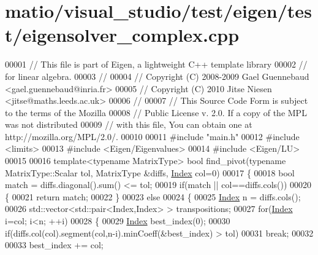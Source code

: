 \hypertarget{matio_2visual__studio_2test_2eigen_2test_2eigensolver__complex_8cpp_source}{}\section{matio/visual\+\_\+studio/test/eigen/test/eigensolver\+\_\+complex.cpp}
\label{matio_2visual__studio_2test_2eigen_2test_2eigensolver__complex_8cpp_source}

\begin{DoxyCode}
00001 \textcolor{comment}{// This file is part of Eigen, a lightweight C++ template library}
00002 \textcolor{comment}{// for linear algebra.}
00003 \textcolor{comment}{//}
00004 \textcolor{comment}{// Copyright (C) 2008-2009 Gael Guennebaud <gael.guennebaud@inria.fr>}
00005 \textcolor{comment}{// Copyright (C) 2010 Jitse Niesen <jitse@maths.leeds.ac.uk>}
00006 \textcolor{comment}{//}
00007 \textcolor{comment}{// This Source Code Form is subject to the terms of the Mozilla}
00008 \textcolor{comment}{// Public License v. 2.0. If a copy of the MPL was not distributed}
00009 \textcolor{comment}{// with this file, You can obtain one at http://mozilla.org/MPL/2.0/.}
00010 
00011 \textcolor{preprocessor}{#include "main.h"}
00012 \textcolor{preprocessor}{#include <limits>}
00013 \textcolor{preprocessor}{#include <Eigen/Eigenvalues>}
00014 \textcolor{preprocessor}{#include <Eigen/LU>}
00015 
00016 \textcolor{keyword}{template}<\textcolor{keyword}{typename} MatrixType> \textcolor{keywordtype}{bool} find\_pivot(\textcolor{keyword}{typename} MatrixType::Scalar tol, MatrixType &diffs, 
      \hyperlink{namespace_eigen_a62e77e0933482dafde8fe197d9a2cfde}{Index} col=0)
00017 \{
00018   \textcolor{keywordtype}{bool} match = diffs.diagonal().sum() <= tol;
00019   \textcolor{keywordflow}{if}(match || col==diffs.cols())
00020   \{
00021     \textcolor{keywordflow}{return} match;
00022   \}
00023   \textcolor{keywordflow}{else}
00024   \{
00025     \hyperlink{namespace_eigen_a62e77e0933482dafde8fe197d9a2cfde}{Index} n = diffs.cols();
00026     std::vector<std::pair<Index,Index> > transpositions;
00027     \textcolor{keywordflow}{for}(\hyperlink{namespace_eigen_a62e77e0933482dafde8fe197d9a2cfde}{Index} i=col; i<n; ++i)
00028     \{
00029       \hyperlink{namespace_eigen_a62e77e0933482dafde8fe197d9a2cfde}{Index} best\_index(0);
00030       \textcolor{keywordflow}{if}(diffs.col(col).segment(col,n-i).minCoeff(&best\_index) > tol)
00031         \textcolor{keywordflow}{break};
00032       
00033       best\_index += col;

\end{DoxyCode}
